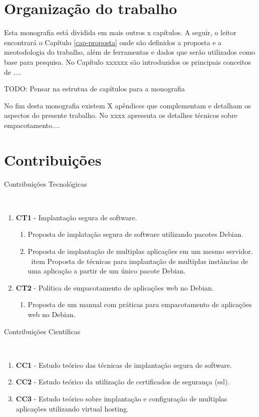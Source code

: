 \section{Organização do trabalho}

%

Esta monografia está dividida em mais outros x capítulos. A seguir, o leitor
encontrará o Capítulo \ref{cap-proposta} onde são definidos a proposta e
a meotodologia do trabalho, além de ferramentas e dados que serão utilizados
como base para pesquisa. No Capítulo xxxxxx
são introduzidos os principais conceitos de  ....

TODO: Pensar na estrutua de capítulos para a monografia

No fim desta monografia existem X apêndices que complementam e detalham os
aspectos do presente trabalho. No  xxxx apresenta os detalhes
técnicos sobre empacotamento....

\section{Contribuições}
%
\begin{description}
  \item [Contribuições Tecnológicas]\
\end{description}
    \begin{enumerate}
      \item \textbf{CT1} - Implantação segura de software.
        \begin{enumerate}
          \item Proposta de implatação segura de software utilizando pacotes
          Debian.
          \item Proposta de implantação de multiplas aplicações em um mesmo
          servidor.
          \ item Proposta de técnicas para implantação de multiplas instâncias
           de uma aplicação a partir de um único pacote Debian.
        \end{enumerate}
      \item \textbf{CT2} - Política de empacotamento de aplicações web no Debian.
            \begin{enumerate}
              \item  Proposta de um manual com práticas para empacotamento de
              aplicações web no Debian.
            \end{enumerate}
    \end{enumerate}
\begin{description}
  \item [Contribuições Científicas]\
\end{description}
     \begin{enumerate}
      \item \textbf{CC1} - Estudo teórico das técnicas de implantação segura de
      software.
      \item \textbf{CC2} - Estudo teórico da utilização de certificados de
      segurança (ssl).
      \item \textbf{CC3} - Estudo teórico sobre implantação e configuração de
      multiplas aplicações utilizando virtual hosting.
     \end{enumerate}

